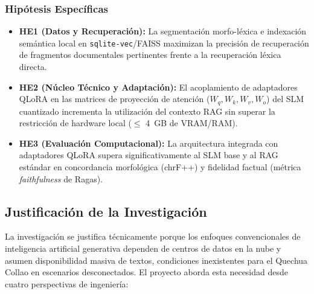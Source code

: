 \subsubsection{Hipótesis Específicas}
\begin{itemize}
	\item \textbf{HE1 (Datos y Recuperación):} La segmentación morfo-léxica e indexación semántica local en \texttt{sqlite-vec}/FAISS maximizan la precisión de recuperación de fragmentos documentales pertinentes frente a la recuperación léxica directa.
	\item \textbf{HE2 (Núcleo Técnico y Adaptación):} El acoplamiento de adaptadores QLoRA en las matrices de proyección de atención ($W_q, W_k, W_v, W_o$) del SLM cuantizado incrementa la utilización del contexto RAG sin superar la restricción de hardware local ($\le$ 4~GB de VRAM/RAM).
	\item \textbf{HE3 (Evaluación Computacional):} La arquitectura integrada con adaptadores QLoRA supera significativamente al SLM base y al RAG estándar en concordancia morfológica (chrF++) y fidelidad factual (métrica \textit{faithfulness} de Ragas).
\end{itemize}

\subsection{Justificación de la Investigación}
La investigación se justifica técnicamente porque los enfoques convencionales de inteligencia artificial generativa dependen de centros de datos en la nube y asumen disponibilidad masiva de textos, condiciones inexistentes para el Quechua Collao en escenarios desconectados. El proyecto aborda esta necesidad desde cuatro perspectivas de ingeniería:

